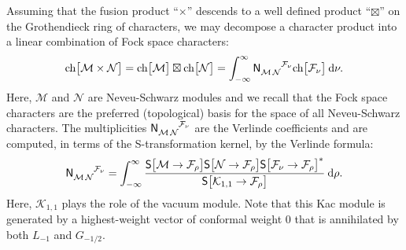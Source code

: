 \documentclass[a4paper,reqno,12pt]{report}
\theoremstyle{definition}
\numberwithin{equation}{section}
\newcommand{\dd}{\mathrm{d}}   %
\newcommand{\ra}{\rightarrow}
\newcommand{\Kac}[1]{\mathcal{K}_{#1}}       %
\newcommand{\Fock}[1]{\mathcal{F}_{#1}}      %
\newcommand{\chmap}{\mathrm{ch}}
\newcommand{\Gr}[1]{\bigl[ #1 \bigr]}            %
\newcommand{\ch}[1]{\chmap \Gr{#1}}              %
\newcommand{\modS}{\mathsf{S}} %
\newcommand{\Smat}[2]{\modS \bigl[ #1 \ra #2 \bigr]}  %
\newcommand{\fuse}{\mathbin{\times}}                                            %
\newcommand{\Grfuse}{\mathbin{\boxtimes}}                                       %
\newcommand{\fuscoeff}[3]{\mathsf{N}_{#1 \, #2}^{\hphantom{#1 \, #2} #3}}       %
\newcommand{\hw}{highest-weight}
\newcommand{\hws}{\hw{} vector}
\newcommand{\ns}{Neveu-Schwarz}
\theoremstyle{plain}
\begin{document}
Assuming that the fusion product ``$\fuse$'' descends to a well defined product ``$\Grfuse$'' on the Grothendieck ring of characters, we may decompose a character product into a linear combination of Fock space characters:
\begin{equation}
\ch{\mathcal{M} \fuse \mathcal{N}} = \ch{\mathcal{M}} \Grfuse \ch{\mathcal{N}} = \int_{-\infty}^{\infty} \fuscoeff{\mathcal{M}}{\mathcal{N}}{\Fock{\nu}} \ch{\Fock{\nu}} \: \dd \nu.
\end{equation}
Here, $\mathcal{M}$ and $\mathcal{N}$ are \ns{} modules and we recall that the Fock space characters are the preferred (topological) basis for the space of all \ns{} characters.  The multiplicities $\fuscoeff{\mathcal{M}}{\mathcal{N}}{\Fock{\nu}}$ are the Verlinde coefficients and are computed, in terms of the S-transformation kernel, by the Verlinde formula:
\begin{equation}
\fuscoeff{\mathcal{M}}{\mathcal{N}}{\Fock{\nu}} = \int_{-\infty}^{\infty} \frac{\Smat{\mathcal{M}}{\Fock{\rho}} \Smat{\mathcal{N}}{\Fock{\rho}} \Smat{\Fock{\nu}}{\Fock{\rho}}^*}{\Smat{\Kac{1,1}}{\Fock{\rho}}} \: \dd \rho.
\end{equation}
Here, $\Kac{1,1}$ plays the role of the vacuum module.  Note that this Kac module is generated by a \hws{} of conformal weight $0$ that is annihilated by both $L_{-1}$ and $G_{-1/2}$.
\end{document}
